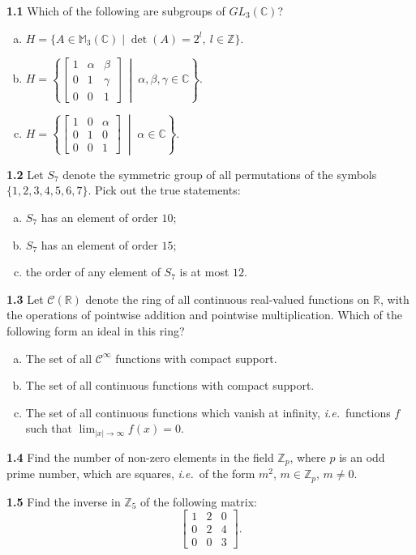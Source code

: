 \documentclass[11pt,a4paper]{article}
\newcommand{\Z}{\mathbb{Z}}
\newcommand{\R}{\mathbb{R}}
\newcommand{\C}{\mathbb{C}}
\newcommand{\M}{\mathbb{M}}
\newcommand{\qitem}[1]{\par\medskip\noindent\textbf{#1}\hspace{0.5em}}
\begin{document}
\qitem{1.1} Which of the following are subgroups of $GL_3(\C)$?
\begin{enumerate}[a.]
  \item $H = \{A \in \M_3(\C) \mid \det(A) = 2^l,\ l \in \Z\}$.
  \item $H = \left\{\begin{bmatrix} 1 & \alpha & \beta \\ 0 & 1 & \gamma \\ 0 & 0 & 1 \end{bmatrix} \;\middle|\; \alpha, \beta, \gamma \in \C\right\}$.
  \item $H = \left\{\begin{bmatrix} 1 & 0 & \alpha \\ 0 & 1 & 0 \\ 0 & 0 & 1 \end{bmatrix} \;\middle|\; \alpha \in \C\right\}$.
\end{enumerate}

\qitem{1.2} Let $S_7$ denote the symmetric group of all permutations of the symbols $\{1, 2, 3, 4, 5, 6, 7\}$. Pick out the true statements:
\begin{enumerate}[a.]
  \item $S_7$ has an element of order $10$;
  \item $S_7$ has an element of order $15$;
  \item the order of any element of $S_7$ is at most $12$.
\end{enumerate}

\qitem{1.3} Let $\mathcal{C}(\R)$ denote the ring of all continuous real-valued functions on $\R$, with the operations of pointwise addition and pointwise multiplication. Which of the following form an ideal in this ring?
\begin{enumerate}[a.]
  \item The set of all $\mathcal{C}^\infty$ functions with compact support.
  \item The set of all continuous functions with compact support.
  \item The set of all continuous functions which vanish at infinity, \emph{i.e.}\ functions $f$ such that $\lim_{|x| \to \infty} f(x) = 0$.
\end{enumerate}

\qitem{1.4} Find the number of non-zero elements in the field $\Z_p$, where $p$ is an odd prime number, which are squares, \emph{i.e.}\ of the form $m^2$, $m \in \Z_p$, $m \neq 0$.

\qitem{1.5} Find the inverse in $\Z_5$ of the following matrix:
\[
  \begin{bmatrix} 1 & 2 & 0 \\ 0 & 2 & 4 \\ 0 & 0 & 3 \end{bmatrix}.
\]
\end{document}
